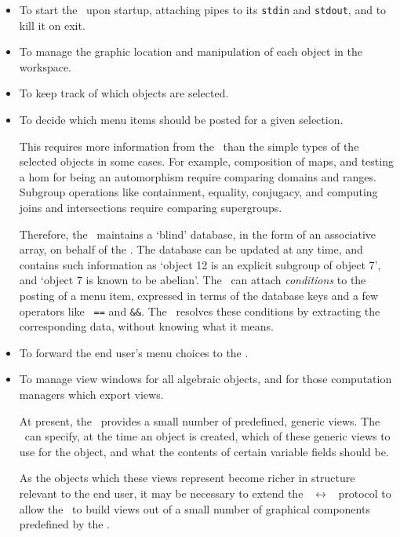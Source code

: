 \begin{itemize}

\item
To start the \SM\ upon startup, attaching pipes to its {\tt stdin} and
{\tt stdout}, and to kill it on exit.

\item
To manage the graphic location and manipulation of each object in the
workspace.

\item
To keep track of which objects are selected.

\item
To decide which menu items should be posted for a given selection.

This requires more information from the \SM\ than the simple types of
the selected objects in some cases. For example, composition of maps,
and testing a hom for being an automorphism require comparing domains
and ranges.  Subgroup operations like containment, equality,
conjugacy, and computing joins and intersections require comparing
supergroups.

Therefore, the \FE\ maintains a `blind' database, in the form of an
associative array, on behalf of the \SM. The database can be updated
at any time, and contains such information as `object 12 is an
explicit subgroup of object 7', and `object 7 is known to be abelian'.
The \SM\ can attach {\em conditions} to the posting of a menu item,
expressed in terms of the database keys and a few operators like {\tt
==} and {\tt \&\&}.  The \FE\ resolves these conditions by extracting
the corresponding data, without knowing what it means.

\item
To forward the end user's menu choices to the \SM.

\item
To manage view windows for all algebraic objects, and for those
computation managers which export views.

At present, the \FE\ provides a small number of predefined, generic
views. The \SM\ can specify, at the time an object is created, which
of these generic views to use for the object, and what the contents of
certain variable fields should be.

As the objects which these views represent become richer in structure
relevant to the end user, it may be necessary to extend the \FE\
$\leftrightarrow$ \SM\ protocol to allow the \SM\ to build views out
of a small number of graphical components predefined by the \FE.

\end{itemize}


